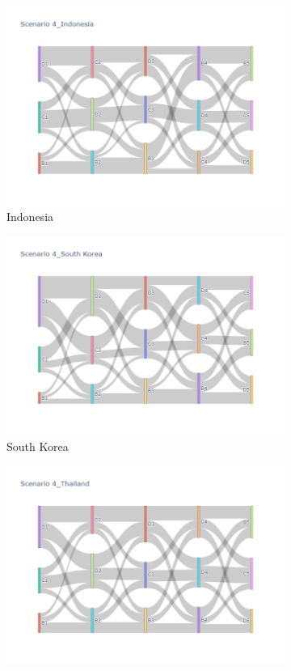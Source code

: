 \begin{figure}[h]
  \begin{subfigure}{0.5\textwidth}
    \centering
    \includegraphics[width=\textwidth]{Figure/figure32d.png}
    \caption{Indonesia}
  \end{subfigure}
  \begin{subfigure}{0.5\textwidth}
    \centering
    \includegraphics[width=\linewidth]{Figure/figure33d.png}
    \caption{South Korea}
  \end{subfigure}
  \begin{subfigure}{0.5\textwidth}
    \centering
    \includegraphics[width=\linewidth]{Figure/figure34d.png}

\end{subfigure}
\end{figure}
